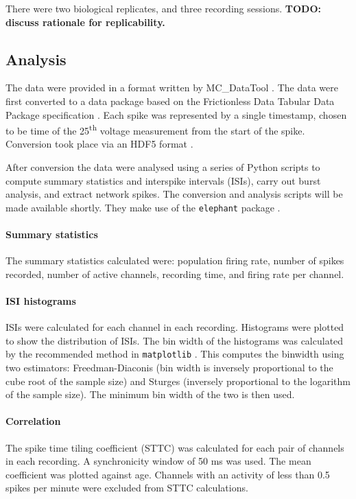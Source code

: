 \documentclass{bmcart}
\begin{document}
\par There were two biological replicates, and three recording
sessions.  \textbf{TODO: discuss rationale for replicability.}

\subsection*{Analysis}
\par The data were provided in a format written by MC\_DataTool \cite{Systems2014-tw}. The data were first converted to a data package based on the Frictionless Data Tabular Data Package specification \cite{Walsh2017-nm}. Each spike was represented by a single timestamp, chosen to be time of the 25\textsuperscript{th} voltage measurement from the start of the spike. Conversion took place via an HDF5 format \cite{Eglen2014}.

\par After conversion the data were analysed using a series of Python scripts to compute summary statistics and interspike intervals (ISIs), carry out burst analysis, and extract network spikes. The conversion and analysis scripts will be made available shortly. They make use of the \texttt{elephant} package \cite{elephant_toolkit}.

\paragraph{Summary statistics} The summary statistics calculated were: population firing rate, number of spikes recorded, number of active channels, recording time, and firing rate per channel.

\paragraph{ISI histograms} ISIs were calculated for each channel in each recording. Histograms were plotted to show the distribution of ISIs. The bin width of the histograms was calculated by the recommended method in \texttt{matplotlib} \cite{Community2020-xp}. This computes the binwidth using two estimators: Freedman-Diaconis (bin width is inversely proportional to the cube root of the sample size) and Sturges (inversely proportional to the logarithm of the sample size). The minimum bin width of the two is then used.

\paragraph{Correlation} The spike time tiling coefficient (STTC) \cite{Cutts2014} was calculated for each pair of channels in each recording. A synchronicity window of 50 ms was used. The mean coefficient was plotted against age. Channels with an activity of less than 0.5 spikes per minute were excluded from STTC calculations.
\end{document}
